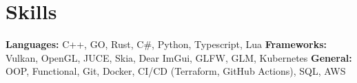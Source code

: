 \vspace{5 pt - 0.3 cm}
\section{Skills}
\begin{onecolentry}
    \textbf{Languages:} C++, GO, Rust, C\#, Python, Typescript, Lua \newline
    \textbf{Frameworks:} Vulkan, OpenGL, JUCE, Skia, Dear ImGui, GLFW, GLM, Kubernetes  \newline
    \textbf{General:} OOP, Functional, Git, Docker, CI/CD (Terraform, GitHub Actions), SQL, AWS \newline
\end{onecolentry} 

